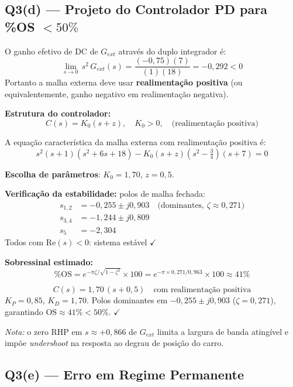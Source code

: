 \documentclass[12pt,a4paper]{article}
\begin{document}
\subsection*{Q3(d) — Projeto do Controlador PD para \%OS $< 50\%$}

\begin{metodo}
  O ganho efetivo de DC de $G_{ext}$ através do duplo integrador é:
  \[\lim_{s\to 0}\,s^2\,G_{ext}(s) = \frac{(-0{,}75)(7)}{(1)(18)} = -0{,}292 < 0\]
  Portanto a malha externa deve usar \textbf{realimentação positiva}
  (ou equivalentemente, ganho negativo em realimentação negativa).
\end{metodo}

\textbf{Estrutura do controlador:}
\[
  C(s) = K_0(s + z), \quad K_0 > 0, \quad \text{(realimentação positiva)}
\]

A equação característica da malha externa com realimentação positiva é:
\[
  s^2(s+1)(s^2+6s+18) - K_0(s+z)(s^2-\tfrac{3}{4})(s+7) = 0
\]

\textbf{Escolha de parâmetros}: $K_0 = 1{,}70$, $z = 0{,}5$.

\textbf{Verificação da estabilidade:} polos de malha fechada:
\begin{align*}
  s_{1,2} &= -0{,}255 \pm j0{,}903 \quad\text{(dominantes, }\zeta \approx 0{,}271\text{)} \\
  s_{3,4} &= -1{,}244 \pm j0{,}809 \\
  s_5     &= -2{,}304
\end{align*}
Todos com $\text{Re}(s) < 0$: sistema estável $\checkmark$

\textbf{Sobressinal estimado:}
\[
  \text{\%OS} = e^{-\pi\zeta/\sqrt{1-\zeta^2}} \times 100
  = e^{-\pi \times 0{,}271/0{,}963} \times 100 \approx 41\%
\]

\begin{resposta}
\[
  \boxed{C(s) = 1{,}70\,(s + 0{,}5)} \quad \text{com realimentação positiva}
\]
$K_P = 0{,}85$, $K_D = 1{,}70$. Polos dominantes em $-0{,}255 \pm j0{,}903$
($\zeta = 0{,}271$), garantindo $\text{OS} \approx 41\% < 50\%$. $\checkmark$

\textit{Nota:} o zero RHP em $s \approx +0{,}866$ de $G_{ext}$ limita a
largura de banda atingível e impõe \textit{undershoot} na resposta ao degrau
de posição do carro.
\end{resposta}

\subsection*{Q3(e) — Erro em Regime Permanente}
\end{document}
